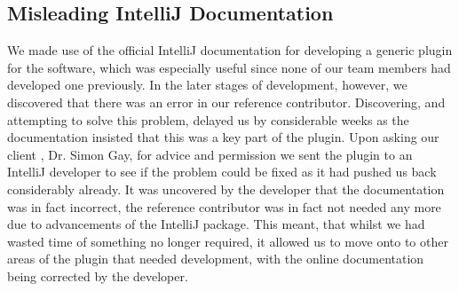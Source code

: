 \subsection {Misleading IntelliJ Documentation}
We made use of the official IntelliJ documentation for developing a generic plugin for the software, which was especially useful since none of our team members had developed one previously. In the later stages of development, however, we discovered that there was an error in our reference contributor. Discovering, and attempting to solve this problem, delayed us by considerable weeks as the documentation insisted that this was a key part of the plugin. Upon asking our client , Dr. Simon Gay, for advice and permission we sent the plugin to an IntelliJ developer to see if the problem could be fixed as it had pushed us back considerably already. It was uncovered by the developer that the documentation was in fact incorrect, the reference contributor was in fact not needed any more due to advancements of the IntelliJ package. This meant, that whilst we had wasted time of something no longer required, it allowed us to move onto to other areas of the plugin that needed development, with the online documentation being corrected by the developer. 

